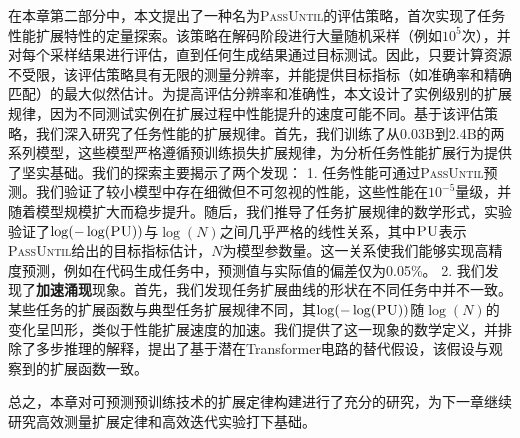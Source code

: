 在本章第二部分中，本文提出了一种名为\textsc{PassUntil}的评估策略，首次实现了任务性能扩展特性的定量探索。该策略在解码阶段进行大量随机采样（例如$10^5$次），并对每个采样结果进行评估，直到任何生成结果通过目标测试。因此，只要计算资源不受限，该评估策略具有无限的测量分辨率，并能提供目标指标（如准确率和精确匹配）的最大似然估计。为提高评估分辨率和准确性，本文设计了实例级别的扩展规律，因为不同测试实例在扩展过程中性能提升的速度可能不同。基于该评估策略，我们深入研究了任务性能的扩展规律。首先，我们训练了从0.03B到2.4B的两系列模型，这些模型严格遵循预训练损失扩展规律，为分析任务性能扩展行为提供了坚实基础。我们的探索主要揭示了两个发现：
1. 任务性能可通过\textsc{PassUntil}预测。我们验证了较小模型中存在细微但不可忽视的性能，这些性能在$10^{-5}$量级，并随着模型规模扩大而稳步提升。随后，我们推导了{任务扩展规律}的数学形式，实验验证了\(\log(-\log(\textsc{PU}))\)与\(\log(N)\)之间几乎严格的线性关系，其中$\textsc{PU}$表示\textsc{PassUntil}给出的目标指标估计，$N$为模型参数量。这一关系使我们能够实现高精度预测，例如在代码生成任务中，预测值与实际值的偏差仅为0.05\%。
2. 我们发现了\textbf{加速涌现}现象。首先，我们发现任务扩展曲线的形状在不同任务中并不一致。某些任务的扩展函数与典型任务扩展规律不同，其\(\log(-\log(\textsc{PU}))\)随\(\log(N)\)的变化呈凹形，类似于性能扩展速度的加速。我们提供了这一现象的数学定义，并排除了多步推理的解释，提出了基于潜在Transformer电路的替代假设，该假设与观察到的扩展函数一致。

总之，本章对可预测预训练技术的扩展定律构建进行了充分的研究，为下一章继续研究高效测量扩展定律和高效迭代实验打下基础。
